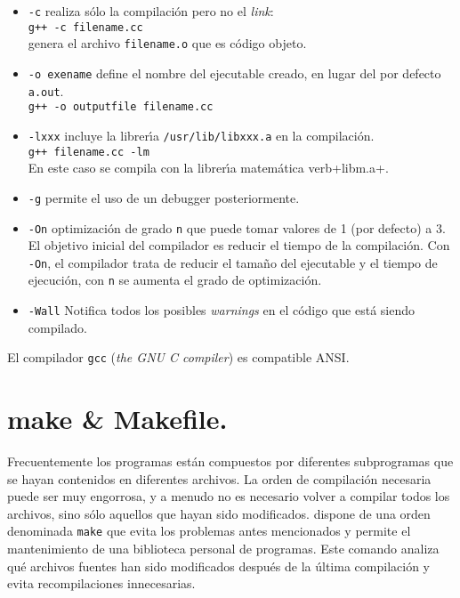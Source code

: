 \begin{itemize}
\item \verb+-c+ realiza s{\'o}lo la compilaci{\'o}n pero no el {\it link}:\\
\verb=g++ -c filename.cc=\\
genera el archivo \verb+filename.o+ que es c{\'o}digo objeto.

\item  \verb+-o exename+ define el nombre del ejecutable creado, en
  lugar del por defecto \verb+a.out+.\\
\verb=g++ -o outputfile filename.cc=

\item \verb+-lxxx+ incluye la librer{\'\i}a \verb+/usr/lib/libxxx.a+ en la compilaci{\'o}n.\\
\verb=g++ filename.cc -lm=\\
En este caso se compila con la librer{\'\i}a matem{\'a}tica verb+libm.a+.

\item  \verb+-g+ permite el uso de un debugger posteriormente. 
  
\item \verb+-On+ optimizaci{\'o}n de grado \verb+n+ que puede tomar
  valores de 1 (por defecto) a 3.  El objetivo inicial del compilador es
  reducir el tiempo de la compilaci{\'o}n. Con \verb+-On+, el compilador
  trata de reducir el tama{\~n}o del ejecutable y el tiempo de ejecuci{\'o}n,
  con \verb+n+ se aumenta el grado de optimizaci{\'o}n.
  
\item \verb=-Wall= Notifica todos los posibles {\it warnings} en el
  c{\'o}digo que est{\'a} siendo compilado.
\end{itemize}

El compilador \verb+gcc+ ({\it the GNU C compiler}) es compatible
ANSI.

\section{make \& Makefile.} 

Frecuentemente los programas est{\'a}n compuestos por diferentes
subprogramas que se hayan contenidos en diferentes archivos. La orden
de compilaci{\'o}n necesaria puede ser muy engorrosa, y a menudo no es
necesario volver a compilar todos los archivos, sino s{\'o}lo aquellos que
hayan sido modificados. {\unix} dispone de una orden denominada
\verb+make+ que evita los problemas antes mencionados y permite el
mantenimiento de una biblioteca personal de programas. Este comando
analiza qu{\'e}  archivos fuentes han sido modificados despu{\'e}s de la
{\'u}ltima compilaci{\'o}n y evita recompilaciones innecesarias. 

